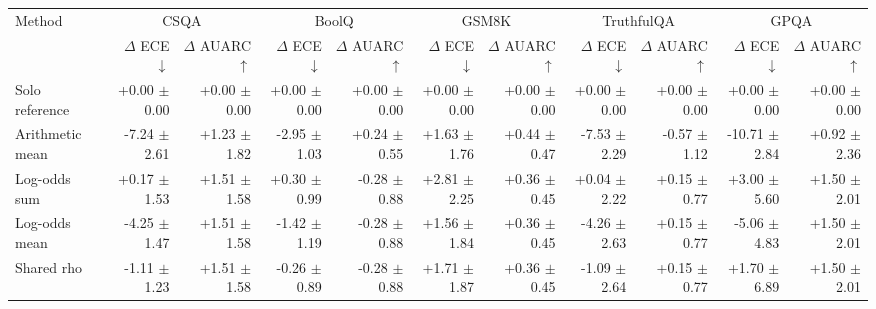 \begin{tabular}{lrrrrrrrrrr}
\toprule
Method & \multicolumn{2}{c}{CSQA} & \multicolumn{2}{c}{BoolQ} & \multicolumn{2}{c}{GSM8K} & \multicolumn{2}{c}{TruthfulQA} & \multicolumn{2}{c}{GPQA} \\
 & $\Delta$ ECE $\downarrow$ & $\Delta$ AUARC $\uparrow$ & $\Delta$ ECE $\downarrow$ & $\Delta$ AUARC $\uparrow$ & $\Delta$ ECE $\downarrow$ & $\Delta$ AUARC $\uparrow$ & $\Delta$ ECE $\downarrow$ & $\Delta$ AUARC $\uparrow$ & $\Delta$ ECE $\downarrow$ & $\Delta$ AUARC $\uparrow$ \\
\midrule
Solo reference & +0.00 {\scriptsize $\pm$ 0.00} & +0.00 {\scriptsize $\pm$ 0.00} & +0.00 {\scriptsize $\pm$ 0.00} & +0.00 {\scriptsize $\pm$ 0.00} & +0.00 {\scriptsize $\pm$ 0.00} & +0.00 {\scriptsize $\pm$ 0.00} & +0.00 {\scriptsize $\pm$ 0.00} & +0.00 {\scriptsize $\pm$ 0.00} & +0.00 {\scriptsize $\pm$ 0.00} & +0.00 {\scriptsize $\pm$ 0.00} \\
Arithmetic mean & -7.24 {\scriptsize $\pm$ 2.61} & +1.23 {\scriptsize $\pm$ 1.82} & -2.95 {\scriptsize $\pm$ 1.03} & +0.24 {\scriptsize $\pm$ 0.55} & +1.63 {\scriptsize $\pm$ 1.76} & +0.44 {\scriptsize $\pm$ 0.47} & -7.53 {\scriptsize $\pm$ 2.29} & -0.57 {\scriptsize $\pm$ 1.12} & -10.71 {\scriptsize $\pm$ 2.84} & +0.92 {\scriptsize $\pm$ 2.36} \\
Log-odds sum & +0.17 {\scriptsize $\pm$ 1.53} & +1.51 {\scriptsize $\pm$ 1.58} & +0.30 {\scriptsize $\pm$ 0.99} & -0.28 {\scriptsize $\pm$ 0.88} & +2.81 {\scriptsize $\pm$ 2.25} & +0.36 {\scriptsize $\pm$ 0.45} & +0.04 {\scriptsize $\pm$ 2.22} & +0.15 {\scriptsize $\pm$ 0.77} & +3.00 {\scriptsize $\pm$ 5.60} & +1.50 {\scriptsize $\pm$ 2.01} \\
Log-odds mean & -4.25 {\scriptsize $\pm$ 1.47} & +1.51 {\scriptsize $\pm$ 1.58} & -1.42 {\scriptsize $\pm$ 1.19} & -0.28 {\scriptsize $\pm$ 0.88} & +1.56 {\scriptsize $\pm$ 1.84} & +0.36 {\scriptsize $\pm$ 0.45} & -4.26 {\scriptsize $\pm$ 2.63} & +0.15 {\scriptsize $\pm$ 0.77} & -5.06 {\scriptsize $\pm$ 4.83} & +1.50 {\scriptsize $\pm$ 2.01} \\
Shared rho & -1.11 {\scriptsize $\pm$ 1.23} & +1.51 {\scriptsize $\pm$ 1.58} & -0.26 {\scriptsize $\pm$ 0.89} & -0.28 {\scriptsize $\pm$ 0.88} & +1.71 {\scriptsize $\pm$ 1.87} & +0.36 {\scriptsize $\pm$ 0.45} & -1.09 {\scriptsize $\pm$ 2.64} & +0.15 {\scriptsize $\pm$ 0.77} & +1.70 {\scriptsize $\pm$ 6.89} & +1.50 {\scriptsize $\pm$ 2.01} \\

\end{tabular}
